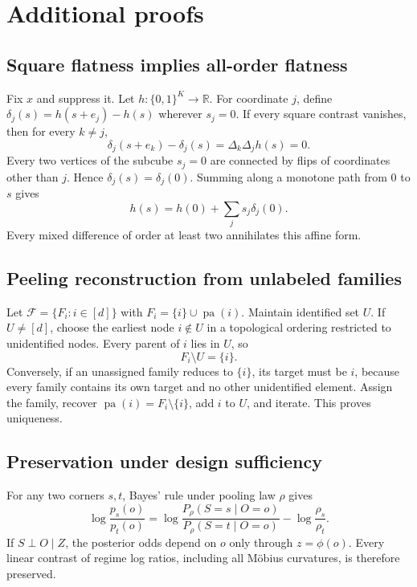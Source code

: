 \documentclass[11pt]{article}
\newcommand{\pa}{\operatorname{pa}}
\newcommand{\R}{\mathbb{R}}
\newcommand{\calF}{\mathcal{F}}
\begin{document}
\appendix

\section{Additional proofs}
\label{app:proofs}

\subsection{Square flatness implies all-order flatness}

Fix \(x\) and suppress it.  Let \(h:\{0,1\}^K\to\R\).  For coordinate \(j\), define \(\delta_j(s)=h(s+e_j)-h(s)\) wherever \(s_j=0\).  If every square contrast vanishes, then for every \(k\ne j\),
\begin{equation}
\delta_j(s+e_k)-\delta_j(s)=\Delta_k\Delta_jh(s)=0.
\end{equation}
Every two vertices of the subcube \(s_j=0\) are connected by flips of coordinates other than \(j\).  Hence \(\delta_j(s)=\delta_j(0)\).  Summing along a monotone path from \(0\) to \(s\) gives
\begin{equation}
h(s)=h(0)+\sum_js_j\delta_j(0).
\end{equation}
Every mixed difference of order at least two annihilates this affine form.

\subsection{Peeling reconstruction from unlabeled families}

Let \(\calF=\{F_i:i\in[d]\}\) with \(F_i=\{i\}\cup\pa(i)\).  Maintain identified set \(U\).  If \(U\ne[d]\), choose the earliest node \(i\notin U\) in a topological ordering restricted to unidentified nodes.  Every parent of \(i\) lies in \(U\), so
\begin{equation}
F_i\setminus U=\{i\}.
\end{equation}
Conversely, if an unassigned family reduces to \(\{i\}\), its target must be \(i\), because every family contains its own target and no other unidentified element.  Assign the family, recover \(\pa(i)=F_i\setminus\{i\}\), add \(i\) to \(U\), and iterate.  This proves uniqueness.

\subsection{Preservation under design sufficiency}

For any two corners \(s,t\), Bayes' rule under pooling law \(\rho\) gives
\begin{equation}
\log\frac{p_s(o)}{p_t(o)}
=
\log\frac{P_\rho(S=s\mid O=o)}{P_\rho(S=t\mid O=o)}
-
\log\frac{\rho_s}{\rho_t}.
\end{equation}
If \(S\perp O\mid Z\), the posterior odds depend on \(o\) only through \(z=\phi(o)\).  Every linear contrast of regime log ratios, including all M\"obius curvatures, is therefore preserved.
\end{document}
